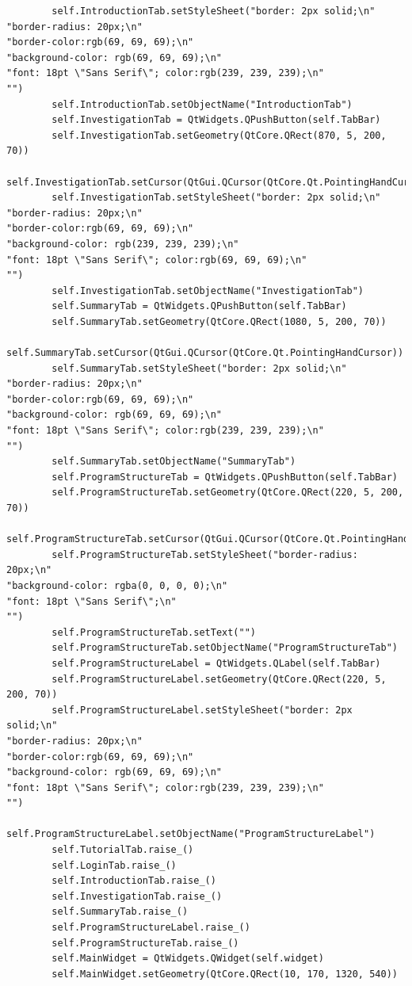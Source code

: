 \documentclass{article}
\begin{document}
\begin{lstlisting}
        self.IntroductionTab.setStyleSheet("border: 2px solid;\n"
"border-radius: 20px;\n"
"border-color:rgb(69, 69, 69);\n"
"background-color: rgb(69, 69, 69);\n"
"font: 18pt \"Sans Serif\"; color:rgb(239, 239, 239);\n"
"")
        self.IntroductionTab.setObjectName("IntroductionTab")
        self.InvestigationTab = QtWidgets.QPushButton(self.TabBar)
        self.InvestigationTab.setGeometry(QtCore.QRect(870, 5, 200, 70))
        self.InvestigationTab.setCursor(QtGui.QCursor(QtCore.Qt.PointingHandCursor))
        self.InvestigationTab.setStyleSheet("border: 2px solid;\n"
"border-radius: 20px;\n"
"border-color:rgb(69, 69, 69);\n"
"background-color: rgb(239, 239, 239);\n"
"font: 18pt \"Sans Serif\"; color:rgb(69, 69, 69);\n"
"")
        self.InvestigationTab.setObjectName("InvestigationTab")
        self.SummaryTab = QtWidgets.QPushButton(self.TabBar)
        self.SummaryTab.setGeometry(QtCore.QRect(1080, 5, 200, 70))
        self.SummaryTab.setCursor(QtGui.QCursor(QtCore.Qt.PointingHandCursor))
        self.SummaryTab.setStyleSheet("border: 2px solid;\n"
"border-radius: 20px;\n"
"border-color:rgb(69, 69, 69);\n"
"background-color: rgb(69, 69, 69);\n"
"font: 18pt \"Sans Serif\"; color:rgb(239, 239, 239);\n"
"")
        self.SummaryTab.setObjectName("SummaryTab")
        self.ProgramStructureTab = QtWidgets.QPushButton(self.TabBar)
        self.ProgramStructureTab.setGeometry(QtCore.QRect(220, 5, 200, 70))
        self.ProgramStructureTab.setCursor(QtGui.QCursor(QtCore.Qt.PointingHandCursor))
        self.ProgramStructureTab.setStyleSheet("border-radius: 20px;\n"
"background-color: rgba(0, 0, 0, 0);\n"
"font: 18pt \"Sans Serif\";\n"
"")
        self.ProgramStructureTab.setText("")
        self.ProgramStructureTab.setObjectName("ProgramStructureTab")
        self.ProgramStructureLabel = QtWidgets.QLabel(self.TabBar)
        self.ProgramStructureLabel.setGeometry(QtCore.QRect(220, 5, 200, 70))
        self.ProgramStructureLabel.setStyleSheet("border: 2px solid;\n"
"border-radius: 20px;\n"
"border-color:rgb(69, 69, 69);\n"
"background-color: rgb(69, 69, 69);\n"
"font: 18pt \"Sans Serif\"; color:rgb(239, 239, 239);\n"
"")
        self.ProgramStructureLabel.setObjectName("ProgramStructureLabel")
        self.TutorialTab.raise_()
        self.LoginTab.raise_()
        self.IntroductionTab.raise_()
        self.InvestigationTab.raise_()
        self.SummaryTab.raise_()
        self.ProgramStructureLabel.raise_()
        self.ProgramStructureTab.raise_()
        self.MainWidget = QtWidgets.QWidget(self.widget)
        self.MainWidget.setGeometry(QtCore.QRect(10, 170, 1320, 540))

\end{lstlisting}
\end{document}
